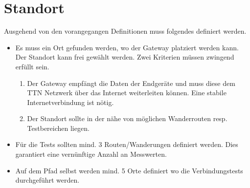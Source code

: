 \documentclass[11pt,english,german]{report}
\theoremstyle{definition}
\begin{document}
\newpage
\section{Standort}
Ausgehend von den vorangegangen Definitionen muss folgendes definiert werden.
\begin{itemize}
	\item Es muss ein Ort gefunden werden, wo der Gateway platziert werden kann.\\[0.3cm]
	Der Standort kann frei gewählt werden. Zwei Kriterien müssen zwingend erfüllt sein. 
	\begin{enumerate}
		\item
		Der Gateway empfängt die Daten der Endgeräte und muss diese dem TTN Netzwerk über das Internet weiterleiten können. Eine stabile Internetverbindung ist nötig. 
		\item 
		Der Standort sollte in der nähe von möglichen Wanderrouten resp. Testbereichen liegen.
	\end{enumerate}
	\item Für die Tests sollten mind. 3 Routen/Wanderungen definiert werden. Dies garantiert eine vernünftige Anzahl an Messwerten.
	\item Auf dem Pfad selbst werden mind. 5 Orte definiert wo die Verbindungstests durchgeführt werden.
\end{itemize}

\newpage
\end{document}
